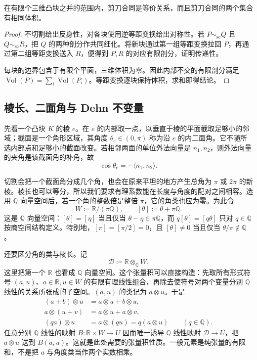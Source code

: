 \begin{proposition}
	\label{g1:prop:scissors-equivalence-volume}
	在有限个三维凸块之并的范围内，剪刀合同是等价关系，而且剪刀合同的两个集合有相同体积。
\end{proposition}
\begin{proof}
	不切割给出反身性，对各块使用逆等距变换给出对称性。若 \(P\sim_{\mathrm{sc}}Q\) 且 \(Q\sim_{\mathrm{sc}}R\)，把 \(Q\) 的两种剖分作共同细化。将新块通过第一组等距变换拉回 \(P\)，再通过第二组等距变换送入 \(R\)，便得到 \(P,R\) 的对应有限剖分，证明传递性。

	每块的边界包含于有限个平面，三维体积为零。因此内部不交的有限剖分满足 \(\operatorname{Vol}(P)=\sum_i\operatorname{Vol}(P_i)\)。等距变换逐块保持体积，求和即得结论。
\end{proof}

\subsection{棱长、二面角与 Dehn 不变量}
\label{g1:subsec:E05:02}

先看一个凸块 \(K\) 的棱 \(e\)。在 \(e\) 的内部取一点，以垂直于棱的平面截取足够小的邻域；截面是一个角形区域，其角度 \(\theta_e\in(0,\pi)\) 称为沿 \(e\) 的内二面角。它不随所选内部点和足够小的截面改变。若相邻两面的单位外法向量是 \(n_1,n_2\)，则外法向量的夹角是该截面角的补角，故
\begin{equation}
	\label{g1:eq:interior-dihedral-normals}
	\cos\theta_e=-\langle n_1,n_2\rangle.
\end{equation}

切割会把一个截面角分成几个角，也会在原来平坦的地方产生总角为 \(\pi\) 或 \(2\pi\) 的新棱。棱长也可以等分，所以我们要求有理系数能在长度与角度的配对之间相容。选用 \(\mathbb Q\) 向量空间后，若一个角的整数倍是整倍 \(\pi\)，它的角类也应为零。为此令
\[
	W\coloneqq\mathbb R/(\pi\mathbb Q),\qquad
	[\theta]\coloneqq\theta+\pi\mathbb Q.
\]
这是 \(\mathbb Q\) 向量空间：\([\theta]=[\eta]\) 当且仅当 \(\theta-\eta\in\pi\mathbb Q\)，而 \(q[\theta]=[q\theta]\) 只对 \(q\in\mathbb Q\) 按商空间结构定义。特别地，\([\pi]=[\pi/2]=0\)，且 \([\theta]\ne0\) 当且仅当 \(\theta/\pi\notin\mathbb Q\)。

\ProseParagraphBreak

还要区分角的类与棱长。记
\[
	\mathcal D\coloneqq\mathbb R\otimes_{\mathbb Q}W.
\]
这里把第一个 \(\mathbb R\) 也看成 \(\mathbb Q\) 向量空间。这个张量积可以直接构造：先取所有形式符号 \((a,u)\)、\(a\in\mathbb R,u\in W\) 的有限有理线性组合，再除去使符号对两个变量分别 \(\mathbb Q\) 线性的关系所张成的子空间。\((a,u)\) 的类记为 \(a\otimes u\)。于是
\begin{align*}
	(a+b)\otimes u&=a\otimes u+b\otimes u,\\
	a\otimes(u+v)&=a\otimes u+a\otimes v,\\
	(qa)\otimes u&=a\otimes(qu)=q(a\otimes u)
	\qquad(q\in\mathbb Q).
\end{align*}
任意分别 \(\mathbb Q\) 线性的映射 \(B:\mathbb R\times W\to U\) 因而唯一诱导 \(\mathbb Q\) 线性映射 \(\mathcal D\to U\)，把 \(a\otimes u\) 送到 \(B(a,u)\)。这就是此处需要的张量积性质。一般元素是纯张量的有限和，不是把 \(a\) 与角度类当作两个实数相乘。

